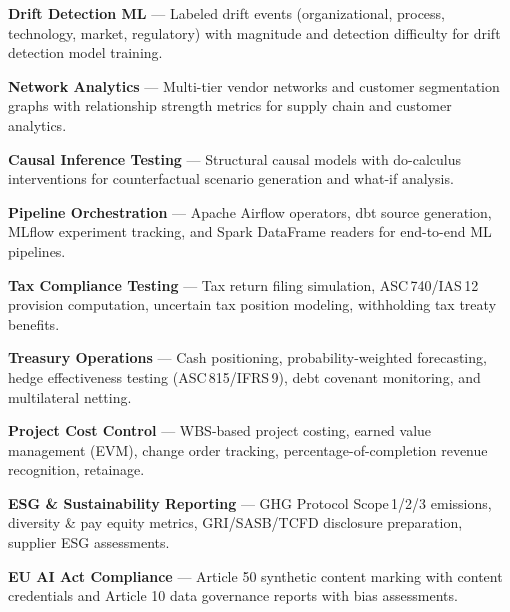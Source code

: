 \documentclass[11pt,a4paper]{article}
\begin{document}
\begin{tcolorbox}[keybox={Primary Use Cases}]
\begin{description}[leftmargin=1em, labelwidth=1em, font=\color{brand}\bfseries]
  \item[$\blacktriangleright$] \textbf{Drift Detection ML} ---
    Labeled drift events (organizational, process, technology, market, regulatory)
    with magnitude and detection difficulty for drift detection model training.

  \item[$\blacktriangleright$] \textbf{Network Analytics} ---
    Multi-tier vendor networks and customer segmentation graphs with
    relationship strength metrics for supply chain and customer analytics.

  \item[$\blacktriangleright$] \textbf{Causal Inference Testing} ---
    Structural causal models with do-calculus interventions for
    counterfactual scenario generation and what-if analysis.

  \item[$\blacktriangleright$] \textbf{Pipeline Orchestration} ---
    Apache Airflow operators, dbt source generation, MLflow experiment
    tracking, and Spark DataFrame readers for end-to-end ML pipelines.

  \item[$\blacktriangleright$] \textbf{Tax Compliance Testing} ---
    Tax return filing simulation, ASC\,740/IAS\,12 provision computation,
    uncertain tax position modeling, withholding tax treaty benefits.

  \item[$\blacktriangleright$] \textbf{Treasury Operations} ---
    Cash positioning, probability-weighted forecasting, hedge effectiveness
    testing (ASC\,815/IFRS\,9), debt covenant monitoring, and multilateral netting.

  \item[$\blacktriangleright$] \textbf{Project Cost Control} ---
    WBS-based project costing, earned value management (EVM), change order
    tracking, percentage-of-completion revenue recognition, retainage.

  \item[$\blacktriangleright$] \textbf{ESG \& Sustainability Reporting} ---
    GHG Protocol Scope\,1/2/3 emissions, diversity \& pay equity metrics,
    GRI/SASB/TCFD disclosure preparation, supplier ESG assessments.

  \item[$\blacktriangleright$] \textbf{EU AI Act Compliance} ---
    Article 50 synthetic content marking with content credentials and
    Article 10 data governance reports with bias assessments.
\end{description}
\end{tcolorbox}
\end{document}
